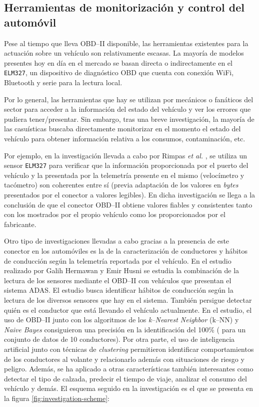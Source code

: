 \subsection{Herramientas de monitorización y control del automóvil}
Pese al tiempo que lleva \ac{OBD}--II disponible, las herramientas existentes para
la actuación sobre un vehículo son relativamente escasas. La mayoría de modelos
presentes hoy en día en el mercado se basan directa o indirectamente en el
\texttt{ELM327}, un dispositivo de diagnóstico \ac{OBD} que cuenta con conexión
WiFi, Bluetooth y serie para la lectura local.

Por lo general, las herramientas que hay se utilizan por mecánicos o fanáticos del
sector para acceder a la información del estado del vehículo y ver los errores que
pudiera tener/presentar. Sin embargo, tras una breve investigación, la mayoría
de las casuísticas buscaba directamente monitorizar en el momento el estado
del vehículo para obtener información relativa a los consumos, contaminación,
etc.

Por ejemplo, en la investigación llevada a cabo por Rimpas \textit{et al.} \cite{rimpasOBDIISensorDiagnostics2020}, se utiliza
un sensor \texttt{ELM327} para verificar que la información proporcionada por
el puerto del vehículo y la presentada por la telemetría presente en el mismo
(velocímetro y tacómetro) son coherentes entre sí (previa adaptación de los
valores en \textit{bytes} presentados por el conector a valores legibles). En
dicha investigación se llega a la conclusión de que el conector \ac{OBD}--II obtiene
valores fiables y consistentes tanto con los mostrados por el propio vehículo
como los proporcionados por el fabricante.

Otro tipo de investigaciones llevadas a cabo gracias a la presencia de este conector
en los automóviles es la de la caracterización de conductores y hábitos de conducción
según la telemetría reportada por el vehículo. En el estudio realizado por
Galih Hermawan y Emir Husni \cite{hermawanAcquisitionModelingEvaluating2020} se
estudia la combinación de la lectura de los sensores mediante el \ac{OBD}--II con
vehículos que presentan el sistema \ac{ADAS}.
El estudio busca identificar hábitos de conducción según la lectura de los diversos
sensores que hay en el sistema. También persigue detectar quién es el conductor que
está llevando el vehículo actualmente. En el estudio, el uso de \ac{OBD}--II junto
con los algoritmos de los \textit{k--Nearest Neighbor} (k--NN) y \textit{Naive Bayes}
consiguieron una precisión en la identificación del 100\% (
para un conjunto de datos de 10 conductores).
Por otra parte, el uso de inteligencia artificial junto con técnicas de \textit{clustering}
permitieron identificar comportamientos de los conductores al volante y relacionarlo
además con situaciones de riesgo y peligro. Además, se ha aplicado a otras características
también interesantes como detectar el tipo de calzada, predecir el tiempo de viaje,
analizar el consumo del vehículo y demás. El esquema seguido en la investigación es el
que se presenta en la figura \ref{fig:investigation-scheme}:

